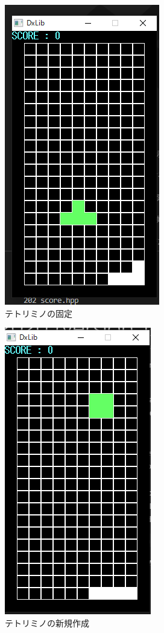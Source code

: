 \begin{figure}[htb]
  \begin{center}
    \includegraphics[scale=0.5]{./soft_img/stick.png}
    \caption{テトリミノの固定}
    \label{stick}
  \end{center}
\end{figure}
\begin{figure}[htb]
  \begin{center}
    \includegraphics[scale=0.5]{./soft_img/newblock.png}
    \caption{テトリミノの新規作成}
    \label{new}
  \end{center}
\end{figure}
